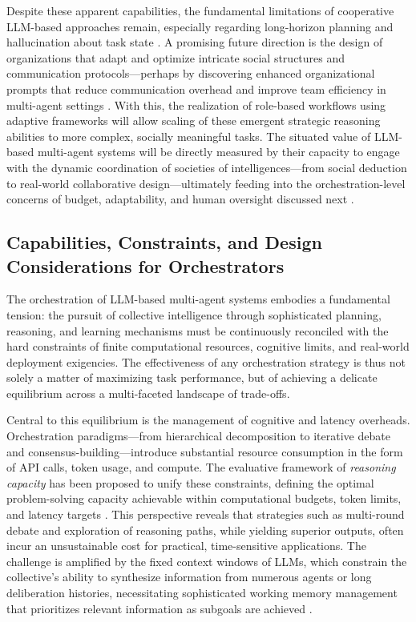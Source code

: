 \documentclass[11pt,a4paper]{article}
\begin{document}
Despite these apparent capabilities, the fundamental limitations of cooperative LLM-based approaches remain, especially regarding long-horizon planning and hallucination about task state \cite{arxiv:2310.10701v2}. A promising future direction is the design of organizations that adapt and optimize intricate social structures and communication protocols---perhaps by discovering enhanced organizational prompts that reduce communication overhead and improve team efficiency in multi-agent settings \cite{arxiv:2403.12482v1}. With this, the realization of role-based workflows using adaptive frameworks \cite{arxiv:2308.10848v3} will allow scaling of these emergent strategic reasoning abilities to more complex, socially meaningful tasks. The situated value of LLM-based multi-agent systems will be directly measured by their capacity to engage with the dynamic coordination of societies of intelligences---from social deduction to real-world collaborative design---ultimately feeding into the orchestration-level concerns of budget, adaptability, and human oversight discussed next \cite{arxiv:2310.02170v1}.


\subsection{Capabilities, Constraints, and Design Considerations for Orchestrators}


The orchestration of LLM-based multi-agent systems embodies a fundamental tension: the pursuit of collective intelligence through sophisticated planning, reasoning, and learning mechanisms must be continuously reconciled with the hard constraints of finite computational resources, cognitive limits, and real-world deployment exigencies. The effectiveness of any orchestration strategy is thus not solely a matter of maximizing task performance, but of achieving a delicate equilibrium across a multi-faceted landscape of trade-offs.

Central to this equilibrium is the management of cognitive and latency overheads. Orchestration paradigms---from hierarchical decomposition to iterative debate and consensus-building---introduce substantial resource consumption in the form of API calls, token usage, and compute. The evaluative framework of \emph{reasoning capacity} has been proposed to unify these constraints, defining the optimal problem-solving capacity achievable within computational budgets, token limits, and latency targets \cite{arxiv:2402.01108v1}. This perspective reveals that strategies such as multi-round debate \cite{arxiv:2311.08562v2} and exploration of reasoning paths, while yielding superior outputs, often incur an unsustainable cost for practical, time-sensitive applications. The challenge is amplified by the fixed context windows of LLMs, which constrain the collective's ability to synthesize information from numerous agents or long deliberation histories, necessitating sophisticated working memory management that prioritizes relevant information as subgoals are achieved \cite{arxiv:2408.09559v1}.
\end{document}
